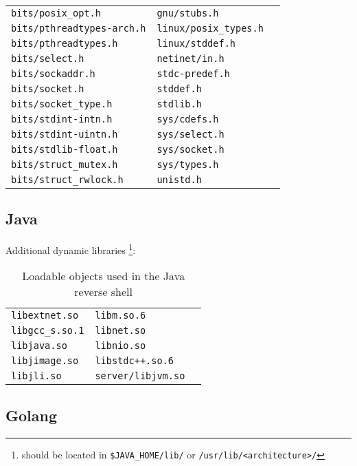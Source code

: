 \begin{longtable}{l l l }
\texttt{bits/posix\_opt.h} & \texttt{gnu/stubs.h} \\
\texttt{bits/pthreadtypes-arch.h} & \texttt{linux/posix\_types.h} \\
\texttt{bits/pthreadtypes.h} & \texttt{linux/stddef.h} \\
\texttt{bits/select.h} & \texttt{netinet/in.h} \\
\texttt{bits/sockaddr.h} & \texttt{stdc-predef.h} \\
\texttt{bits/socket.h} & \texttt{stddef.h} \\
\texttt{bits/socket\_type.h} & \texttt{stdlib.h} \\
\texttt{bits/stdint-intn.h} & \texttt{sys/cdefs.h} \\
\texttt{bits/stdint-uintn.h} & \texttt{sys/select.h} \\
\texttt{bits/stdlib-float.h} & \texttt{sys/socket.h} \\
\texttt{bits/struct\_mutex.h} & \texttt{sys/types.h} \\
\texttt{bits/struct\_rwlock.h} & \texttt{unistd.h} \\
\end{longtable}


\subsection*{Java}

Additional dynamic libraries \footnote{should be located in \texttt{\$JAVA\_HOME/lib/} or \texttt{/usr/lib/<architecture>/}}:

\begin{longtable}{l l l}
\caption{Loadable objects used in the Java reverse shell}\label{tab:java-dpd} \\
\texttt{libextnet.so} & \texttt{libm.so.6} \\
\texttt{libgcc\_s.so.1} & \texttt{libnet.so} \\
\texttt{libjava.so} & \texttt{libnio.so} \\
\texttt{libjimage.so} & \texttt{libstdc++.so.6} \\
\texttt{libjli.so} & \texttt{server/libjvm.so} \\
\end{longtable}


\subsection*{Golang}


